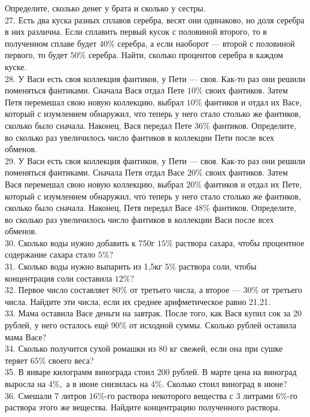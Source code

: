 Определите, сколько денег у брата и сколько у сестры.\\
27. Есть два куска разных сплавов серебра, весят они одинаково, но доля серебра в них различна. Если сплавить первый кусок с половиной второго, то в полученном сплаве будет
$40\%$ серебра, а если наоборот --- второй с половиной первого, то будет $50\%$ серебра. Найти, сколько процентов серебра в каждом куске.\\
28. У Васи есть своя коллекция фантиков, у Пети --- своя. Как-то раз они решили поменяться фантиками. Сначала Вася отдал Пете $10\%$ своих фантиков. Затем Петя перемешал свою новую коллекцию, выбрал $10\%$ фантиков и отдал их Васе, который с изумлением обнаружил, что теперь у него стало столько же фантиков, сколько было сначала. Наконец, Вася передал Пете $36\%$ фантиков. Определите, во сколько раз увеличилось число фантиков в коллекции Пети после всех обменов.\\
29. У Васи есть своя коллекция фантиков, у Пети --- своя. Как-то раз они решили поменяться фантиками. Сначала Петя отдал Васе $20\%$ своих фантиков. Затем Вася перемешал свою новую коллекцию, выбрал $20\%$ фантиков и отдал их Пете, который с изумлением обнаружил, что теперь у него стало столько же фантиков, сколько было сначала. Наконец, Петя передал Васе $48\%$ фантиков. Определите, во сколько раз увеличилось число фантиков в коллекции Васи после всех обменов.\\
30. Сколько воды нужно добавить к 750г $15\%$ раствора сахара, чтобы процентное содержание сахара стало $5\%?$\\
31. Сколько воды нужно выпарить из 1,5кг $5\%$ раствора соли, чтобы концентрация соли составила $12\%?$\\
32. Первое число составляет $80\%$ от третьего числа, а второе --- $30\%$ от третьего числа. Найдите эти числа, если их среднее арифметическое равно 21,21.\\
33. Мама оставила Васе деньги на завтрак. После того, как Вася купил сок за 20 рублей, у него осталось ещё $90\%$ от исходной суммы. Сколько рублей оставила мама Васе?\\
34. Сколько получится сухой ромашки из 80 кг свежей, если она при сушке теряет $65\%$ своего веса?\\
35. В январе килограмм винограда стоил 200 рублей. В марте цена на виноград выросла на $4\%,$ а в июне снизилась на $4\%.$ Сколько стоил виноград в июне?\\
36. Смешали 7 литров $16\%$-го раствора некоторого вещества с 3 литрами $6\%$-го раствора этого же вещества. Найдите концентрацию полученного раствора.\\
